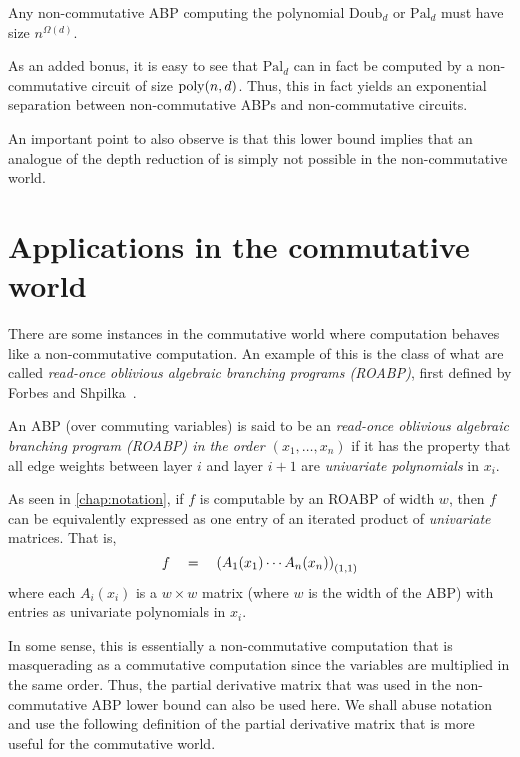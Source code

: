 \begin{theorem} Any non-commutative ABP computing the polynomial $\mathrm{Doub}_d$ or $\mathrm{Pal}_d$ must have size $n^{\Omega(d)}$. 
\end{theorem}

As an added bonus, it is easy to see that $\mathrm{Pal}_d$ can in fact be computed by a non-commutative circuit of size $\operatorname{poly}(n,d)$.
Thus, this in fact yields an exponential separation between non-commutative ABPs and non-commutative circuits.
 
An important point to also observe is that this lower bound implies that an analogue of the depth reduction of \cite{vsbr83} is simply not possible in the non-commutative world. 

\section{Applications in the commutative world}

There are some instances in the commutative world where computation behaves like a non-commutative computation.
An example of this is the class of what are called \emph{read-once oblivious algebraic branching programs (ROABP)}, first defined by Forbes and Shpilka~\cite{FS13}. 


\begin{definition}
An ABP (over commuting variables) is said to be an \emph{read-once oblivious algebraic branching program (ROABP) in the order $(x_1,\ldots, x_n)$} if it has the property that all edge weights between layer $i$ and layer $i+1$ are \emph{univariate polynomials} in $x_i$.
\end{definition}


As seen in \autoref{chap:notation}, if $f$ is computable by an ROABP of width $w$,  then $f$ can be equivalently expressed as one entry of an iterated product of \emph{univariate} matrices.
That is,
\[
f \quad = \quad \left(A_{1}(x_1) \cdots A_n(x_n)\right)_{(1,1)}
\]
where each $A_i(x_i)$ is a $w\times w$ matrix (where $w$ is the width of the ABP) with entries as univariate polynomials in $x_i$. 

In some sense, this is essentially a non-commutative computation that is masquerading as a commutative computation since the variables are multiplied in the same order.
Thus, the partial derivative matrix that was used in the non-commutative ABP lower bound can also be used here.
We shall abuse notation and use the following definition of the partial derivative matrix that is more useful for the commutative world.

